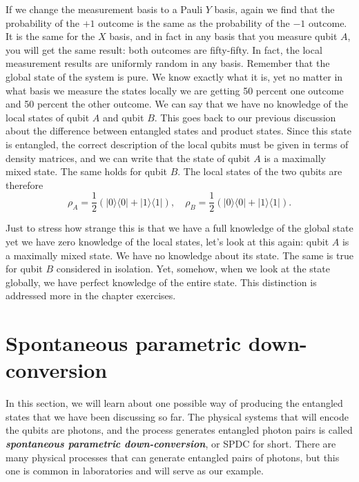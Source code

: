 If we change the measurement basis to a Pauli $Y$ basis, again we find that the probability of the $+1$ outcome is the same as the probability of the $-1$ outcome. It is the same for the $X$ basis, and in fact in any basis that you measure qubit $A$, you will get the same result: both outcomes are fifty-fifty. In fact, the local measurement results are uniformly random in any basis.
Remember that the global state of the system is pure.
We know exactly what it is, yet no matter in what basis we measure the states locally we are getting 50 percent one outcome and 50 percent the other outcome.
We can say that we have no knowledge of the local states of qubit $A$ and qubit $B$.
This goes back to our previous discussion about the difference between entangled states and product states. 
Since this state is entangled, the correct description of the local qubits must be given in terms of density matrices, and we can write that the state of qubit $A$ is a maximally mixed state.
The same holds for qubit $B$.
The local states of the two qubits are therefore
\begin{equation}
    \rho_A=\frac{1}{2}(|0\rangle\langle 0|+| 1\rangle\langle 1|), \quad
    \rho_B=\frac{1}{2}(|0\rangle\langle 0|+| 1\rangle\langle 1|).
\end{equation}

Just to stress how strange this is that we have a full knowledge of the global state yet we have zero knowledge of the local states, let's look at this again: qubit $A$ is a maximally mixed state. We have no knowledge about its state. The same is true for qubit $B$ considered in isolation. Yet, somehow, when we look at the state globally, we have perfect knowledge of the entire state. This distinction is addressed more in the chapter exercises.


\section{Spontaneous parametric down-conversion}
\label{sec:4-4_spdc}

In this section, we will learn about one possible way of producing the entangled states that we have been discussing so far.
The physical systems that will encode the qubits are photons, and the process generates entangled photon pairs is called \textbf{\emph{spontaneous parametric down-conversion}}, or SPDC for short. There are many physical processes that can generate entangled pairs of photons, but this one is common in laboratories and will serve as our example.

